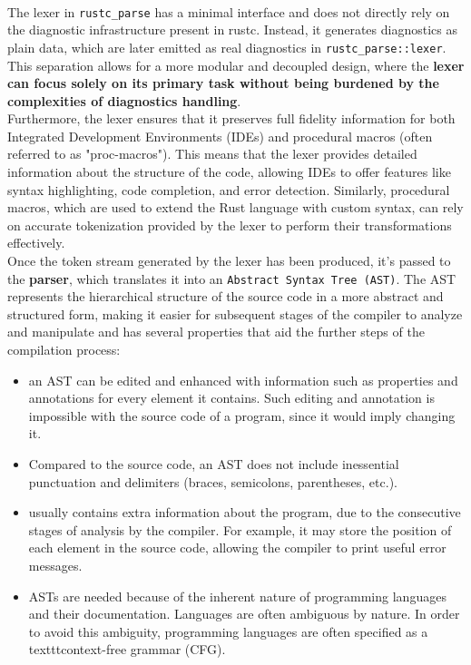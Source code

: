 \documentclass{article}
\begin{document}
\\The lexer in \texttt{rustc\_parse} has a minimal interface and does not directly rely on the diagnostic infrastructure present in rustc. Instead, it generates diagnostics as plain data, which are later emitted as real diagnostics in \texttt{rustc\_parse::lexer}. This separation allows for a more modular and decoupled design, where the \textbf{lexer can focus solely on its primary task without being burdened by the complexities of diagnostics handling}.\\Furthermore, the lexer ensures that it preserves full fidelity information for both Integrated Development Environments (IDEs) and procedural macros (often referred to as "proc-macros"). This means that the lexer provides detailed information about the structure of the code, allowing IDEs to offer features like syntax highlighting, code completion, and error detection. Similarly, procedural macros, which are used to extend the Rust language with custom syntax, can rely on accurate tokenization provided by the lexer to perform their transformations effectively.\\ Once the token stream generated by the lexer has been produced, it's passed to the \textbf{parser}, which translates it into an \texttt{Abstract Syntax Tree (AST)}. The AST represents the hierarchical structure of the source code in a more abstract and structured form, making it easier for subsequent stages of the compiler to analyze and manipulate and has several properties that aid the further steps of the compilation process:
\begin{itemize}
    \item an AST can be edited and enhanced with information such as properties and annotations for every element it contains. Such editing and annotation is impossible with the source code of a program, since it would imply changing it.
    \item Compared to the source code, an AST does not include inessential punctuation and delimiters (braces, semicolons, parentheses, etc.).
    \item usually contains extra information about the program, due to the consecutive stages of analysis by the compiler. For example, it may store the position of each element in the source code, allowing the compiler to print useful error messages.
    \item ASTs are needed because of the inherent nature of programming languages and their documentation. Languages are often ambiguous by nature. In order to avoid this ambiguity, programming languages are often specified as a texttt{context-free grammar (CFG)}. 
\end{itemize}
\end{document}
